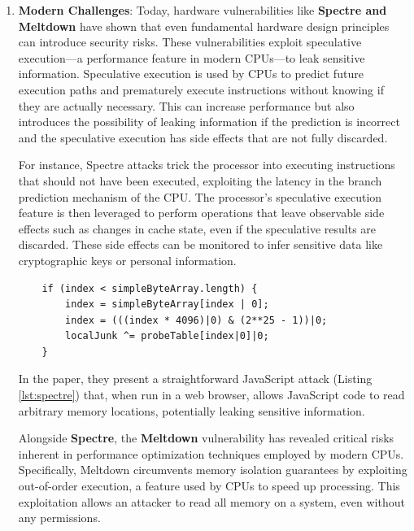 \begin{enumerate}
  \def\labelenumi{\arabic{enumi}.}
  \setcounter{enumi}{3}
  \item
    \textbf{Modern Challenges}: Today, hardware vulnerabilities like
    \textbf{Spectre and Meltdown}\cite{SpectreSecurityVulnerability2024,MeltdownSecurityVulnerability2024} have shown that even fundamental
    hardware design principles can introduce security risks. These
    vulnerabilities exploit speculative execution---a performance feature in modern CPUs---to leak sensitive information. Speculative execution is used by CPUs to predict future execution paths and prematurely execute instructions without knowing if they are actually necessary\cite{lampsonLazySpeculativeExecution2006, raghavanDynamicSchemesSpeculative1998}. This can increase performance but also introduces the possibility of leaking information if the prediction is incorrect and the speculative execution has side effects that are not fully discarded.
  
    For instance, Spectre attacks trick the processor into executing instructions that should not have been executed, exploiting the latency in the branch prediction mechanism of the CPU. The processor's speculative execution feature is then leveraged to perform operations that leave observable side effects such as changes in cache state, even if the speculative results are discarded. These side effects can be monitored to infer sensitive data like cryptographic keys or personal information.\cite{kocherSpectreAttacksExploiting2018}
  
    \begin{verbatim}
    if (index < simpleByteArray.length) {
        index = simpleByteArray[index | 0];
        index = (((index * 4096)|0) & (2**25 - 1))|0;
        localJunk ^= probeTable[index|0]|0;
    }
    \end{verbatim}
    \label{lst:spectre}

      In the paper, they present a straightforward JavaScript attack (Listing \ref{lst:spectre}) that, when run in a web browser, allows JavaScript code to read arbitrary memory locations, potentially leaking sensitive information.

      Alongside \textbf{Spectre}, the \textbf{Meltdown} vulnerability has revealed critical risks inherent in performance optimization techniques employed by modern CPUs. Specifically, Meltdown circumvents memory isolation guarantees by exploiting out-of-order execution, a feature used by CPUs to speed up processing. This exploitation allows an attacker to read all memory on a system, even without any permissions\cite{lippMeltdown2018}.


\end{enumerate}
